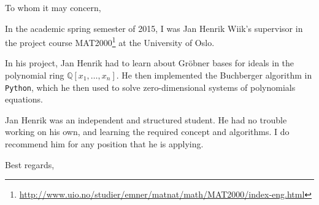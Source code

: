 \documentclass[
  fontsize=11pt,
  paper=a4,
  parskip=half,
  enlargefirstpage=on,    %
  fromalign=right,        %
  fromphone=off,           %
  fromrule=aftername,     %
  addrfield=off,           %
  backaddress=on,         %
  subject=beforeopening,  %
  locfield=narrow,        %
  foldmarks=on,           %
]{scrlttr2}
\begin{document}
  \begin{letter}{}
    \opening{To whom it may concern,}

In the academic spring semester of 2015, I was Jan Henrik Wiik's supervisor in the project course MAT2000\footnote{\url{http://www.uio.no/studier/emner/matnat/math/MAT2000/index-eng.html}} at the University of Oslo.

In his project, Jan Henrik had to learn about Gröbner bases for ideals in the polynomial ring $\mathbb Q[x_1,\ldots,x_n]$. He then implemented the Buchberger algorithm in \texttt{Python}, which he then used to solve zero-dimensional systems of polynomials equations.

Jan Henrik was an independent and structured student. He had no trouble working on his own, and learning the required concept and algorithms. I do recommend him for any position that he is applying.


\closing{Best regards,}


\end{letter}
\end{document}
